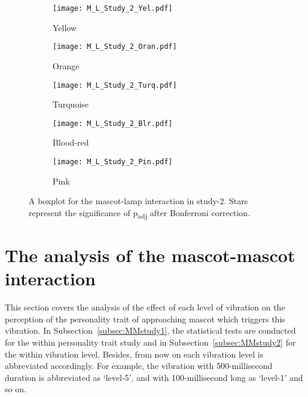 \begin{figure}[hbt!]
    \centering
    \begin{subfigure}{.40\textwidth}
        \centering
        \texttt{[image: M\_L\_Study\_2\_Yel.pdf]}
        \caption{Yellow}
        \label{fig:sub1}
    \end{subfigure}\hfill%
    \begin{subfigure}{.40\textwidth}
        \centering
        \texttt{[image: M\_L\_Study\_2\_Oran.pdf]}
        \caption{Orange}
        \label{fig:sub2}
    \end{subfigure}\hfill
    \begin{subfigure}{.40\textwidth}
        \centering
        \texttt{[image: M\_L\_Study\_2\_Turq.pdf]}
        \caption{Turquoise}
        \label{fig:sub1}
    \end{subfigure}\hfill%
    \begin{subfigure}{.40\textwidth}
        \centering
        \texttt{[image: M\_L\_Study\_2\_Blr.pdf]}
        \caption{Blood-red}
        \label{fig:sub1}
    \end{subfigure}\hfill%
    \begin{subfigure}{.40\textwidth}
        \centering
        \texttt{[image: M\_L\_Study\_2\_Pin.pdf]}
        \caption{Pink}
        \label{fig:sub1}
    \end{subfigure}\hfill%
    \caption{A boxplot for the mascot-lamp interaction in study-2.
    Stars represent the significance of p\textsubscript{adj} after Bonferroni correction.}
    \label{fig:ML2}
\end{figure}
\section{The analysis of the mascot-mascot interaction}
\label{sec:m-m}
This section covers the analysis of the effect of each level of vibration on the perception
of the personality trait of approaching mascot which triggers this vibration.
In Subsection~\ref{subsec:MMstudy1}, the statistical tests are conducted for the within
personality trait study and in Subsection~\ref{subsec:MMstudy2} for the within vibration level.
Besides, from now on each vibration level is abbreviated accordingly.
For example, the vibration with 500-millisecond duration is abbreviated
as ‘level-5’, and with 100-millisecond long as ‘level-1’ and so on.

